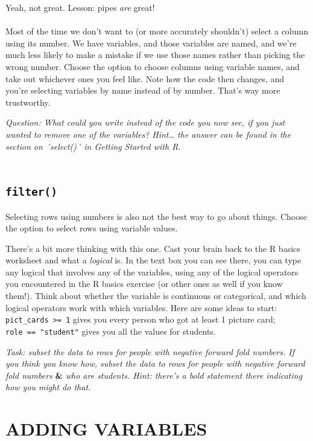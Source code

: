 \documentclass[
]{book}
\begin{document}
Yeah, not great. Lesson: pipes \emph{are} great!\\
~\\

Most of the time we don't want to (or more accurately shouldn't) select a
column using its number. We have variables, and those variables are named,
and we're much less likely to make a mistake if we use those names rather
than picking the wrong number. Choose the option to choose columns using variable
names, and take out whichever ones you feel like. Note how the code then changes,
and you're selecting variables by name instead of by number. That's way more trustworthy.

\emph{Question: What could you write instead of the code you now see, if you just
wanted to remove one of the variables? Hint\ldots{} the answer can be found in the
section on ´select()´ in Getting Started with R.}\\
~\\

\hypertarget{filter}{%
\subsection{\texorpdfstring{\texttt{filter()}}{filter()}}\label{filter}}

Selecting rows using numbers is also not the best way to go about things. Choose
the option to select rows using variable values.

There's a bit more thinking with this one. Cast your brain back to the R basics
worksheet and what a \emph{logical} is. In the text box you can see there, you can type
any logical that involves any of the variables, using any of the logical
operators you encountered in the R basics exercise (or other ones as well if you
know them!). Think about whether the variable is continuous or categorical, and
which logical operators work with which variables. Here are some ideas to
start: \texttt{pict\_cards\ \textgreater{}=\ 1} gives you every person who got at least 1 picture card;
\texttt{role\ ==\ "student"} gives you all the values for students.

\emph{Task: subset the data to rows for people with negative forward fold numbers.
If you think you know how, subset the data to rows for people with negative
forward fold numbers} \textbf{\&} \emph{who are students. Hint: there's a bold statement
there indicating how you might do that.}\\

\hypertarget{adding-variables}{%
\section{ADDING VARIABLES}\label{adding-variables}}
\end{document}
